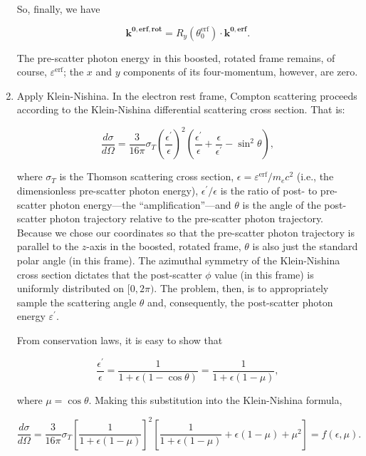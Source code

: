 \documentclass[letterpaper]{article}
\begin{document}
\begin{enumerate}
\noindent So, finally, we have

\begin{equation}
\mathbf{k^{0, erf, rot}} = R_y(\theta^\mathrm{erf}_0) \cdot \mathbf{k^{0, erf}}.
\end{equation}

The pre-scatter photon energy in this boosted, rotated frame remains, of course, $\varepsilon^\mathrm{erf}$; the $x$ and $y$ components of its four-momentum, however, are zero.

\item Apply Klein-Nishina. In the electron rest frame, Compton scattering proceeds according to the Klein-Nishina differential scattering cross section. That is:

\begin{equation}
\frac{d \sigma}{d \Omega} = \frac{3}{16\pi} \sigma_T \left( \frac{\epsilon^\prime}{\epsilon} \right)^2 \left( \frac{\epsilon^\prime}{\epsilon} + \frac{\epsilon}{\epsilon^\prime} - \sin^2 \theta \right),
\end{equation}

\noindent where $\sigma_T$ is the Thomson scattering cross section, $\epsilon = \varepsilon^\mathrm{erf}/m_e c^2$ (i.e., the dimensionless pre-scatter photon energy), $\epsilon^\prime/\epsilon$ is the ratio of post- to pre-scatter photon energy---the ``amplification''---and $\theta$ is the angle of the post-scatter photon trajectory relative to the pre-scatter photon trajectory. Because we chose our coordinates so that the pre-scatter photon trajectory is parallel to the $z$-axis in the boosted, rotated frame, $\theta$ is also just the standard polar angle (in this frame). The azimuthal symmetry of the Klein-Nishina cross section dictates that the post-scatter $\phi$ value (in this frame) is uniformly distributed on $[0, 2\pi)$. The problem, then, is to appropriately sample the scattering angle $\theta$ and, consequently, the post-scatter photon energy $\varepsilon^\prime$.

From conservation laws, it is easy to show that

\begin{equation}
\frac{\epsilon^\prime}{\epsilon} = \frac{1}{1 + \epsilon (1 - \cos \theta)} = \frac{1}{1 + \epsilon (1 - \mu)},
\label{eq:KN_energy_ratio}
\end{equation}

\noindent where $\mu = \cos \theta$. Making this substitution into the Klein-Nishina formula,

\begin{equation}
\frac{d \sigma}{d \Omega} = \frac{3}{16\pi} \sigma_T \left[\frac{1}{1 + \epsilon (1 - \mu)}\right]^2 \left[ \frac{1}{1 + \epsilon (1 - \mu)} + \epsilon(1 - \mu) + \mu^2 \right] = f(\epsilon, \mu).
\end{equation}


\end{enumerate}
\end{document}

